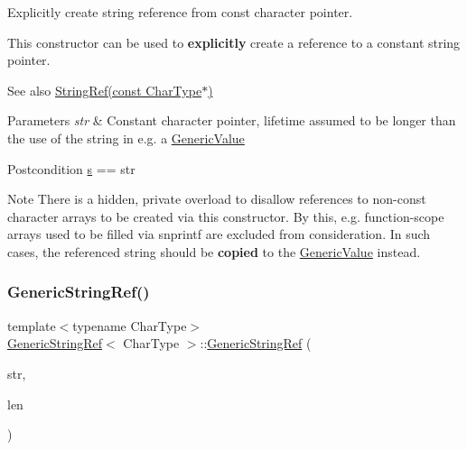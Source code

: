 Explicitly create string reference from {\ttfamily const} character pointer. 

This constructor can be used to {\bfseries explicitly} create a reference to a constant string pointer.

\begin{DoxySeeAlso}{See also}
\hyperlink{structGenericStringRef_aa6b9fd9f6aa49405a574c362ba9af6b5}{String\+Ref(const Char\+Type$\ast$)}
\end{DoxySeeAlso}

\begin{DoxyParams}{Parameters}
{\em str} & Constant character pointer, lifetime assumed to be longer than the use of the string in e.\+g. a \hyperlink{classGenericValue}{Generic\+Value}\\
\hline
\end{DoxyParams}
\begin{DoxyPostcond}{Postcondition}
\hyperlink{structGenericStringRef_aec7a5900ea6f3e42f0ea8403d5135103}{s} == str
\end{DoxyPostcond}
\begin{DoxyNote}{Note}
There is a hidden, private overload to disallow references to non-\/const character arrays to be created via this constructor. By this, e.\+g. function-\/scope arrays used to be filled via {\ttfamily snprintf} are excluded from consideration. In such cases, the referenced string should be {\bfseries copied} to the \hyperlink{classGenericValue}{Generic\+Value} instead. 
\end{DoxyNote}
\mbox{\label{structGenericStringRef_a8b2c6a7fdc4da1e7055f7fdcf0ac517f}} 
\subsubsection{\texorpdfstring{Generic\+String\+Ref()}{GenericStringRef()}\hspace{0.1cm}{\footnotesize\ttfamily [6/6]}}
{\footnotesize\ttfamily template$<$typename Char\+Type$>$ \\
\hyperlink{structGenericStringRef}{Generic\+String\+Ref}$<$ Char\+Type $>$\+::\hyperlink{structGenericStringRef}{Generic\+String\+Ref} (\begin{DoxyParamCaption}\item[{const Char\+Type $\ast$}]{str,  }\item[{Size\+Type}]{len }\end{DoxyParamCaption})\hspace{0.3cm}{\ttfamily [inline]}}



